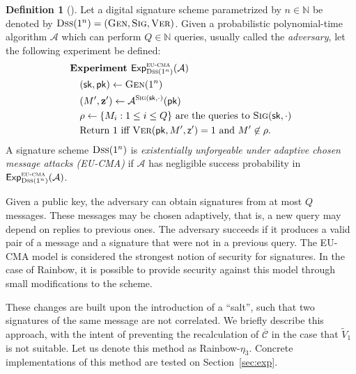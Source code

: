 \documentclass[12pt, a4paper, oneside]{memoir}
\theoremstyle{definition}
\newtheorem{definition}[theorem]{Definition}
\begin{document}
\begin{definition}[{\cite[Def.~1.2]{Chen:201612}}]
  Let a digital signature scheme parametrized by $n \in \mathbb{N}$ be denoted by $\textsc{Dss}(1^{n}) = (\textsc{Gen}, \textsc{Sig}, \textsc{Ver})$. Given a probabilistic polynomial-time algorithm $\mathcal{A}$ which can perform $Q \in \mathbb{N}$ queries, usually called the \emph{adversary}, let the following experiment be defined:
  \begin{align}
    \begin{split}
      &\textbf{Experiment } \mathsf{Exp}_{\textsc{Dss}(1^{n})}^{\textsc{eu-cma}}(\mathcal{A}) \\ 
      &\quad (\mathsf{sk}, \mathsf{pk}) \gets \textsc{Gen}(1^{n}) \\
      &\quad (M', \mathbf{z'}) \gets \mathcal{A}^{\textsc{Sig}(\mathsf{sk}, \cdot)}(\mathsf{pk}) \\
      &\quad \rho \gets \{ M_{i} : 1 \leq i \leq Q \} \text{ are the queries to } \textsc{Sig}(\mathsf{sk}, \cdot) \\
      &\quad \text{Return 1 iff } \textsc{Ver}(\mathsf{pk}, M', \mathsf{z'}) = 1 \text{ and } M' \not\in \rho.
    \end{split}
  \end{align}
  A signature scheme $\textsc{Dss}(1^{n})$ is \emph{existentially unforgeable under adaptive chosen message attacks (\textsf{EU-CMA})} if $\mathcal{A}$ has negligible success probability in $\mathsf{Exp}_{\textsc{Dss}(1^{n})}^{\textsc{eu-cma}}(\mathcal{A})$.
\end{definition}

Given a public key, the adversary can obtain signatures from at most $Q$ messages. These messages may be chosen adaptively, that is, a new query may depend on replies to previous ones. The adversary succeeds if it produces a valid pair of a message and a signature that were not in a previous query. The \textsf{EU-CMA} model is considered the strongest notion of security for signatures. In the case of Rainbow, it is possible to provide security against this model through small modifications to the scheme.

These changes are built upon the introduction of a ``salt'', such that two signatures of the same message are not correlated. We briefly describe this approach, with the intent of preventing the recalculation of $\overline{\mathcal{C}}$ in the case that $\widetilde{V}_{1}$ is not suitable. Let us denote this method as Rainbow-$\eta_{3}$. Concrete implementations of this method are tested on Section~\ref{sec:exp}.
\end{document}

